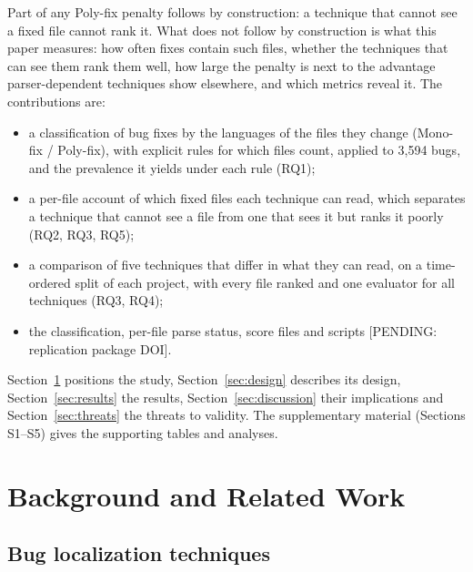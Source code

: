 \documentclass[a4paper,fleqn]{cas-dc}
\newcommand{\pending}[1]{\textcolor{red!70!black}{[PENDING: #1]}}
\begin{document}
\noindent Part of any Poly-fix penalty follows by construction: a technique
that cannot see a fixed file cannot rank it. What does not follow by construction is what
this paper measures: how often fixes contain such files, whether the
techniques that can see them rank them well, how large the penalty is next to
the advantage parser-dependent techniques show elsewhere, and which metrics
reveal it. The contributions are:
\begin{itemize}[itemsep=1pt]
\item a classification of bug fixes by the languages of the files they change
  (Mono-fix / Poly-fix), with explicit rules for which files count, applied to
  3{,}594 bugs, and the prevalence it yields under each rule (RQ1);
\item a per-file account of which fixed files each technique can read, which
  separates a technique that cannot see a file from one that sees it but ranks
  it poorly (RQ2, RQ3, RQ5);
\item a comparison of five techniques that differ in what they can read, on a
  time-ordered split of each project, with every file ranked and one evaluator
  for all techniques (RQ3, RQ4);
\item the classification, per-file parse status, score files and scripts
  \pending{replication package DOI}.
\end{itemize}

\noindent Section~\ref{sec:background} positions the study,
Section~\ref{sec:design} describes its design, Section~\ref{sec:results} the
results, Section~\ref{sec:discussion} their implications and
Section~\ref{sec:threats} the threats to validity. The supplementary material
(Sections S1--S5) gives the supporting tables and analyses.

\section{Background and Related Work}\label{sec:background}

\subsection{Bug localization techniques}
\end{document}
